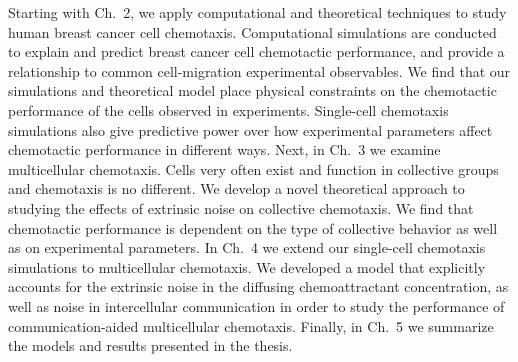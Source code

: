 Starting with Ch.\ 2, we apply computational and theoretical techniques to study human breast cancer cell chemotaxis. Computational simulations are conducted to explain and predict breast cancer cell chemotactic performance, and provide a relationship to common cell-migration experimental observables. We find that our simulations and theoretical model place physical constraints on the chemotactic performance of the cells observed in experiments. Single-cell chemotaxis simulations also give predictive power over how experimental parameters affect chemotactic performance in different ways.
Next, in Ch.\ 3 we examine multicellular chemotaxis. Cells very often exist and function in collective groups and chemotaxis is no different. We develop a novel theoretical approach to studying the effects of extrinsic noise on collective chemotaxis. We find that chemotactic performance is dependent on the type of collective behavior as well as on experimental parameters.
In Ch.\ 4 we extend our single-cell chemotaxis simulations to multicellular chemotaxis. We developed a model that explicitly accounts for the extrinsic noise in the diffusing chemoattractant concentration, as well as noise in intercellular communication in order to study the performance of communication-aided multicellular chemotaxis. Finally, in Ch.\ 5 we summarize the models and results presented in the thesis.




